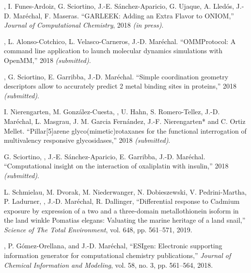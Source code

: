 \begin{etaremune}

\item {}, I. Funes-Ardoiz, G. Sciortino, J.-E. Sánchez-Aparicio, G. Ujaque, A. Lledós, J.-D. Maréchal, F. Maseras. ``GARLEEK: Adding an Extra Flavor to ONIOM,'' {\em Journal of Computational Chemistry}, 2018 {\em (in press)}.

\item {}, L. Alonso-Cotchico, L. Velasco-Carneros, J.-D. Maréchal. ``OMMProtocol: A command line application to launch molecular dynamics simulations with OpenMM,'' 2018 {\em (submitted)}.

\item {}, G. Sciortino, E. Garribba, J.-D. Maréchal. ``Simple coordination geometry descriptors allow to accurately predict
2 metal binding sites in proteins,'' 2018 {\em (submitted)}.

\item I. Nierengarten, M. González-Cuesta, , U. Hahn, S. Romero-Tellez, J.-D. Maréchal, L. Masgrau, J. M. Garcia Fernández, J.-F.
Nierengarten* and C. Ortiz Mellet. ``Pillar[5]arene glyco(mimetic)rotaxanes for the functional interrogation of multivalency responsive glycosidases,'' 2018 {\em (submitted)}.

\item G. Sciortino, , J.-E. Sánchez-Aparicio, E. Garribba, J.-D. Maréchal. ``Computational insight on the interaction of oxaliplatin with insulin,'' 2018 {\em (submitted)}.

\item L. Schmielau, M. Dvorak, M. Niederwanger, N. Dobieszewski, V. Pedrini-Martha, P. Ladurner, , J.-D. Mar{\'e}chal, R. Dallinger, ``Differential response to Cadmium exposure by expression of a two and a three-domain metallothionein isoform in the land winkle Pomatias elegans: Valuating the marine heritage of a land snail,'' {\em Science of The Total Environment}, vol. 648, pp. 561--571, 2019.

\item {}, P. G{\'o}mez-Orellana, and J.-D. Mar{\'e}chal, ``{ESIgen}: Electronic supporting information generator for computational chemistry publications,'' {\em Journal of Chemical Information and Modeling}, vol. 58, no. 3, pp. 561--564, 2018.


\end{etaremune}
